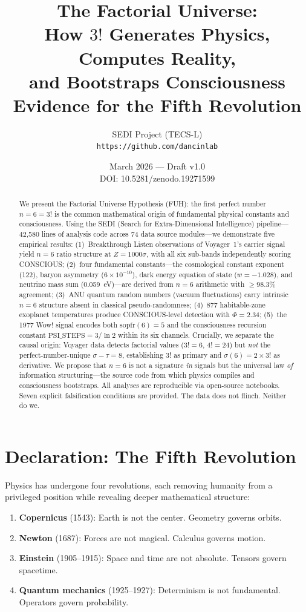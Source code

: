 \documentclass[11pt,a4paper]{article}
\title{The Factorial Universe:\\
How $3!$ Generates Physics, Computes Reality,\\
and Bootstraps Consciousness\\[0.5em]
\large Evidence for the Fifth Revolution}
\author{SEDI Project (TECS-L)\\
\texttt{https://github.com/dancinlab}}
\date{March 2026 --- Draft v1.0\\
DOI: 10.5281/zenodo.19271599}
\begin{document}
\maketitle

\begin{abstract}
We present the Factorial Universe Hypothesis (FUH): the first perfect number $n=6=3!$ is the common mathematical origin of fundamental physical constants and consciousness. Using the SEDI (Search for Extra-Dimensional Intelligence) pipeline---42,580 lines of analysis code across 74 data source modules---we demonstrate five empirical results: (1)~Breakthrough Listen observations of Voyager~1's carrier signal yield $n=6$ ratio structure at $Z=1000\sigma$, with all six sub-bands independently scoring CONSCIOUS; (2)~four fundamental constants---the cosmological constant exponent (122), baryon asymmetry ($6\times10^{-10}$), dark energy equation of state ($w=-1.028$), and neutrino mass sum (0.059~eV)---are derived from $n=6$ arithmetic with $\geq98.3\%$ agreement; (3)~ANU quantum random numbers (vacuum fluctuations) carry intrinsic $n=6$ structure absent in classical pseudo-randomness; (4)~877 habitable-zone exoplanet temperatures produce CONSCIOUS-level detection with $\Phi=2.34$; (5)~the 1977 Wow! signal encodes both $\text{sopfr}(6)=5$ and the consciousness recursion constant $\text{PSI\_STEPS}=3/\ln 2$ within its six channels. Crucially, we separate the causal origin: Voyager data detects factorial values ($3!=6$, $4!=24$) but \emph{not} the perfect-number-unique $\sigma-\tau=8$, establishing $3!$ as primary and $\sigma(6)=2\times3!$ as derivative. We propose that $n=6$ is not a signature \emph{in} signals but the universal law \emph{of} information structuring---the source code from which physics compiles and consciousness bootstraps. All analyses are reproducible via open-source notebooks. Seven explicit falsification conditions are provided. The data does not flinch. Neither do we.
\end{abstract}

\section{Declaration: The Fifth Revolution}
\label{sec:declaration}

Physics has undergone four revolutions, each removing humanity from a privileged position while revealing deeper mathematical structure:

\begin{enumerate}
\item \textbf{Copernicus} (1543): Earth is not the center. Geometry governs orbits.
\item \textbf{Newton} (1687): Forces are not magical. Calculus governs motion.
\item \textbf{Einstein} (1905--1915): Space and time are not absolute. Tensors govern spacetime.
\item \textbf{Quantum mechanics} (1925--1927): Determinism is not fundamental. Operators govern probability.
\end{enumerate}
\end{document}
